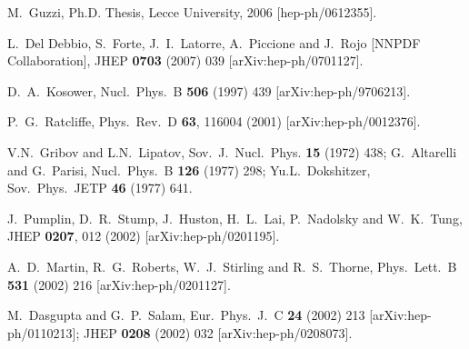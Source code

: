 \documentclass[12pt]{article}
\begin{document}
\begin{thebibliography}{99}
  M.~Guzzi, Ph.D. Thesis, Lecce University, 2006 [hep-ph/0612355].

  L.~Del Debbio, S.~Forte, J.~I.~Latorre, A.~Piccione and J.~Rojo  [NNPDF
                  Collaboration],
  JHEP {\bf 0703} (2007) 039
  [arXiv:hep-ph/0701127].

  D.~A.~Kosower,
  Nucl.\ Phys.\  B {\bf 506} (1997) 439
  [arXiv:hep-ph/9706213].

  P.~G.~Ratcliffe,
  Phys.\ Rev.\  D {\bf 63}, 116004 (2001)
  [arXiv:hep-ph/0012376].

V.N.~Gribov and L.N.~Lipatov, 
Sov.\ J.\ Nucl.\ Phys. {\bf 15} (1972) 438;
G.~Altarelli and G.~Parisi, 
Nucl.\ Phys.\ B {\bf 126} (1977) 298;
Yu.L.~Dokshitzer, 
Sov.\ Phys.\ JETP {\bf 46} (1977) 641.

  J.~Pumplin, D.~R.~Stump, J.~Huston, H.~L.~Lai, P.~Nadolsky and W.~K.~Tung,
  JHEP {\bf 0207}, 012 (2002)
  [arXiv:hep-ph/0201195].

  A.~D.~Martin, R.~G.~Roberts, W.~J.~Stirling and R.~S.~Thorne,
  Phys.\ Lett.\  B {\bf 531} (2002) 216
  [arXiv:hep-ph/0201127].

  M.~Dasgupta and G.~P.~Salam,
  Eur.\ Phys.\ J.\  C {\bf 24} (2002) 213
  [arXiv:hep-ph/0110213];
  JHEP {\bf 0208} (2002) 032
  [arXiv:hep-ph/0208073].




\end{thebibliography}
\end{document}
